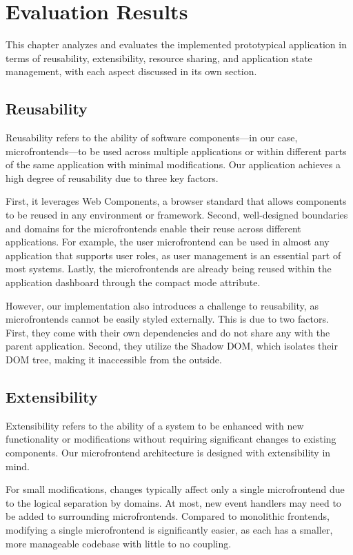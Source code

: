\chapter{Evaluation Results}
\label{chap:EvaluationResults}
This chapter analyzes and evaluates the implemented prototypical application in terms of reusability, extensibility, resource sharing, and application state management, with each aspect discussed in its own section.

\section{Reusability}
Reusability refers to the ability of software components—in our case, microfrontends—to be used across multiple applications or within different parts of the same application with minimal modifications. Our application achieves a high degree of reusability due to three key factors.

First, it leverages Web Components, a browser standard that allows components to be reused in any environment or framework. Second, well-designed boundaries and domains for the microfrontends enable their reuse across different applications. For example, the user microfrontend can be used in almost any application that supports user roles, as user management is an essential part of most systems. Lastly, the microfrontends are already being reused within the application dashboard through the compact mode attribute. 

However, our implementation also introduces a challenge to reusability, as microfrontends cannot be easily styled externally. This is due to two factors. First, they come with their own dependencies and do not share any with the parent application. Second, they utilize the Shadow DOM, which isolates their DOM tree, making it inaccessible from the outside.

\section{Extensibility}
Extensibility refers to the ability of a system to be enhanced with new functionality or modifications without requiring significant changes to existing components. Our microfrontend architecture is designed with extensibility in mind. 

For small modifications, changes typically affect only a single microfrontend due to the logical separation by domains. At most, new event handlers may need to be added to surrounding microfrontends. Compared to monolithic frontends, modifying a single microfrontend is significantly easier, as each has a smaller, more manageable codebase with little to no coupling.


